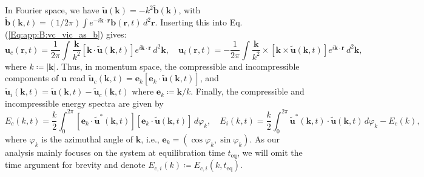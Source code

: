 \documentclass[aps,prl,twocolumn,showpacs,notitlepage,floatfix,superscriptaddress]{revtex4-1}
\begin{document}
In Fourier space, we have $\boldsymbol{\tilde{u}}(\boldsymbol{k})=-{k}^{2}\boldsymbol{\tilde{b}}(\boldsymbol{k})$, with $\boldsymbol{\tilde{b}} \left( \boldsymbol{k}, t \right) 
= 
\left( 1 / 2 \pi \right) 
\int 
e^{- i \boldsymbol{k} \cdot \boldsymbol{r}} 
\boldsymbol{b} \left( \boldsymbol{r}, t \right) 
\, d^2 \boldsymbol{r} $.
Inserting this into Eq. (\ref{Eq:app:B:vc_vic_as_b}) gives:
\begin{equation}\label{u_c_and_u_i_expressed_as_k_integrals}
\boldsymbol{u}_{c} \left( \boldsymbol{r}, t \right) 
=  
\frac{1}{2 \pi} 
\int 
\frac{\boldsymbol{k}}{k^2} 
\left\lbrack 
\boldsymbol{k} 
\cdot 
\boldsymbol{\tilde{u}} \left( \boldsymbol{k}, t \right) 
\right\rbrack 
e^{i \boldsymbol{k} \cdot \boldsymbol{r}} 
\, d^2 \boldsymbol{k} 
, \quad 
\boldsymbol{u}_{i} \left( \boldsymbol{r}, t \right) 
= 
- 
\frac{1}{2 \pi} 
\int 
\frac{\boldsymbol{k}}{k^2} 
\times 
\left\lbrack 
\boldsymbol{k} 
\times 
\boldsymbol{\tilde{u}} \left( \boldsymbol{k}, t \right) 
\right\rbrack 
e^{i \boldsymbol{k} \cdot \boldsymbol{r}} 
\, d^2 \boldsymbol{k} 
, 
\end{equation}
where $k \coloneqq \left\vert \boldsymbol{k} \right\vert$. 
Thus, in momentum space, the compressible and incompressible components of $\boldsymbol{u}$ read
$
\boldsymbol{\tilde{u}}_{c} \left( \boldsymbol{k}, t \right) 
= 
\boldsymbol{e}_k 
\left\lbrack 
\boldsymbol{e}_k 
\cdot 
\boldsymbol{\tilde{u}} \left( \boldsymbol{k}, t \right) 
\right\rbrack 
$, and 
$
\boldsymbol{\tilde{u}}_{i} \left( \boldsymbol{k}, t \right) 
= 
\boldsymbol{\tilde{u}} \left( \boldsymbol{k}, t \right) 
- 
\boldsymbol{\tilde{u}}_{c} \left( \boldsymbol{k}, t \right) 
$ where $\boldsymbol{e}_k \coloneqq \boldsymbol{k} / k$.
Finally, the compressible and incompressible energy spectra are given by
\begin{equation}\label{E_c_k_and_E_i_k_equations}
E_{c} \left( k 
, t 
\right) 
= 
\frac{k}{2}
\int_{0}^{2 \pi} 
\left\lbrack 
\boldsymbol{e}_k 
\cdot 
\boldsymbol{\tilde{u}}^{*} \left( \boldsymbol{k}, t \right) 
\right\rbrack 
\left\lbrack 
\boldsymbol{e}_k 
\cdot 
\boldsymbol{\tilde{u}} \left( \boldsymbol{k}, t \right) 
\right\rbrack 
\, d \varphi_k 
, \quad 
E_{i} \left( k 
, t 
\right) 
= 
\frac{k}{2}
\int_{0}^{2 \pi} 
\boldsymbol{\tilde{u}}^{*} \left( \boldsymbol{k}, t \right) 
\cdot 
\boldsymbol{\tilde{u}} \left( \boldsymbol{k}, t \right) 
\, d \varphi_k 
- 
E_{c} \left( k \right) 
, 
\end{equation}
where $\varphi_k$ is the azimuthal angle of $\boldsymbol{k}$, i.e., $\boldsymbol{e}_k = \left( \cos \varphi_k, \sin \varphi_k \right)$. 
As our analysis mainly focuses on the system at equilibration time $t_{\textrm{eq}}$, we will omit the time argument for brevity and denote $E_{c, i}(k) \coloneqq E_{c, i}(k, t_{\textrm{eq}})$. 
\end{document}
